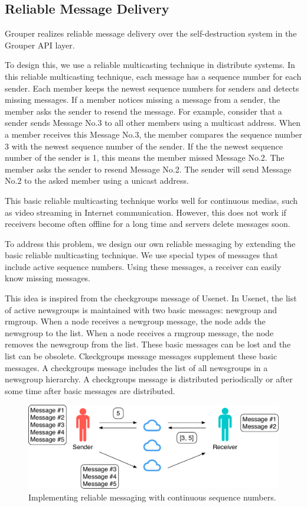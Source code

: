\documentclass[twocolumn,10pt]{article}
\begin{document}
\subsection{Reliable Message Delivery}

Grouper realizes reliable message delivery over the self-destruction system in the Grouper API layer.

To design this, we use a reliable multicasting technique in distribute systems\cite{tanenbaum2007distributed}.
In this reliable multicasting technique, each message has a sequence number for each sender.
Each member keeps the newest sequence numbers for senders and detects missing messages.
If a member notices missing a message from a sender, the member asks the sender to resend the message.
For example, consider that a sender sends Message No.3 to all other members using a multicast address.
When a member receives this Message No.3, the member compares the sequence number 3 with the newest sequence number of the sender.
If the the newest sequence number of the sender is 1, this means the member missed Message No.2.
The member asks the sender to resend Message No.2.
The sender will send Message No.2 to the asked member using a unicast address.

This basic reliable multicasting technique works well for continuous medias, such as video streaming in Internet communication.
However, this does not work if receivers become often offline for a long time and servers delete messages soon.

To address this problem, we design our own reliable messaging by extending the basic reliable multicasting technique.
We use special types of messages that include active sequence numbers.
Using these messages, a receiver can easily know missing messages.

This idea is inspired from the checkgroups message of Usenet\cite{usenet}.
In Usenet, the list of active newsgroups is maintained with two basic messages: newgroup and rmgroup.
When a node receives a newgroup message, the node adds the newsgroup to the list.
When a node receives a rmgroup message, the node removes the newsgroup from the list.
These basic messages can be lost and the list can be obsolete.
Ckeckgroups message messages supplement these basic messages.
A checkgroups message includes the list of all newsgroups in a newsgroup hierarchy.
A checkgroups message is distributed periodically or after some time after basic messages are distributed.

\begin{figure}[t]
	\centering
	\includegraphics[scale=0.38]{reliable_sync}
	\caption{Implementing reliable messaging with continuous sequence numbers.}
\end{figure}
\end{document}
